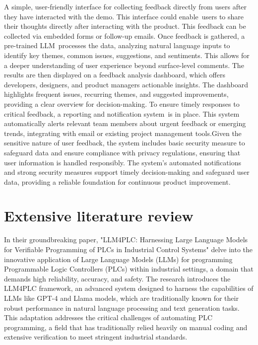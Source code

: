\documentclass[journal,transmag]{IEEEtran}
\begin{document}
A simple, user-friendly interface for collecting feedback directly from users after they have interacted with the demo. This interface could enable users to share their thoughts directly after interacting with the product. This feedback can be collected via embedded forms or follow-up emails. Once feedback is gathered, a pre-trained LLM processes the data, analyzing natural language inputs to identify key themes, common issues, suggestions, and sentiments. This allows for a deeper understanding of user experience beyond surface-level comments. The results are then displayed on a feedback analysis dashboard, which offers developers, designers, and product managers actionable insights. The dashboard highlights frequent issues, recurring themes, and suggested improvements, providing a clear overview for decision-making. To ensure timely responses to critical feedback, a reporting and notification system is in place. This system automatically alerts relevant team members about urgent feedback or emerging trends, integrating with email or existing project management tools.Given the sensitive nature of user feedback, the system includes basic security measure to safeguard data and ensure compliance with privacy regulations, ensuring that user information is handled responsibly. The system’s automated notifications and strong security measures support timely decision-making and safeguard user data, providing a reliable foundation for continuous product improvement. 

\section{Extensive literature review}



In their groundbreaking paper, "LLM4PLC: Harnessing Large Language Models for Verifiable Programming of PLCs in Industrial Control Systems"\cite{fakih2024llm4plc} delve into the innovative application of Large Language Models (LLMs) for programming Programmable Logic Controllers (PLCs) within industrial settings, a domain that demands high reliability, accuracy, and safety. The research introduces the LLM4PLC framework, an advanced system designed to harness the capabilities of LLMs like GPT-4 and Llama models, which are traditionally known for their robust performance in natural language processing and text generation tasks. This adaptation addresses the critical challenges of automating PLC programming, a field that has traditionally relied heavily on manual coding and extensive verification to meet stringent industrial standards.
\end{document}
